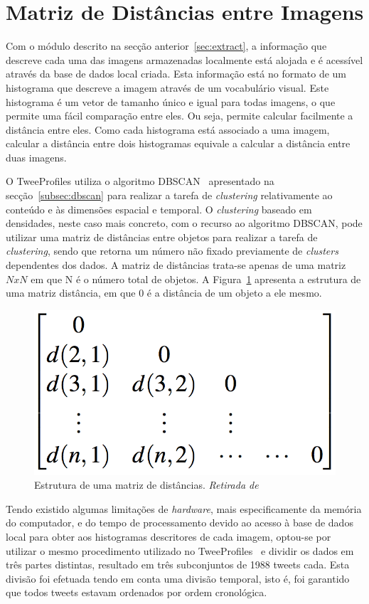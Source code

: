 \section{Matriz de Distâncias entre Imagens}\label{sec:matdist}

Com o módulo descrito na secção anterior~\ref{sec:extract}, a informação que descreve cada uma das imagens armazenadas localmente está alojada e é acessível através da base de dados local criada. Esta informação está no formato de um histograma que descreve a imagem através de um vocabulário visual. Este histograma é um vetor de tamanho único e igual para todas imagens, o que permite uma fácil comparação entre eles. Ou seja, permite calcular facilmente a distância entre eles. Como cada histograma está associado a uma imagem, calcular a distância entre dois histogramas equivale a calcular a distância entre duas imagens.

O TweeProfiles utiliza o algoritmo DBSCAN~\cite{Han2006} apresentado na secção~\ref{subsec:dbscan} para realizar a tarefa de \textit{clustering} relativamente ao conteúdo e às dimensões espacial e temporal. O \textit{clustering} baseado em densidades, neste caso mais concreto, com o recurso ao algoritmo DBSCAN, pode utilizar uma matriz de distâncias entre objetos para realizar a tarefa de \textit{clustering}, sendo que retorna um número não fixado previamente de \textit{clusters} dependentes dos dados. A matriz de distâncias trata-se apenas de uma matriz $ N x N $ em que N é o número total de objetos. A Figura~\ref{fig:matriz} apresenta a estrutura de uma matriz distância, em que 0 é a distância de um objeto a ele mesmo.

\begin{figure}[h]
\centering
\includegraphics[width=0.3\linewidth]{./figures/matrizdist}
\caption{Estrutura de uma matriz de distâncias. \textit{Retirada de}~\cite{Han2006}}
\label{fig:matriz}
\end{figure}

Tendo existido algumas limitações de \textit{hardware}, mais especificamente da memória do computador, e do tempo de processamento devido ao acesso à base de dados local para obter aos histogramas descritores de cada imagem, optou-se por utilizar o mesmo procedimento utilizado no TweeProfiles~\cite{Cunha2013} e dividir os dados em três partes distintas, resultado em três subconjuntos de 1988 tweets cada. Esta divisão foi efetuada tendo em conta uma divisão temporal, isto é, foi garantido que todos tweets estavam ordenados por ordem cronológica.
 
